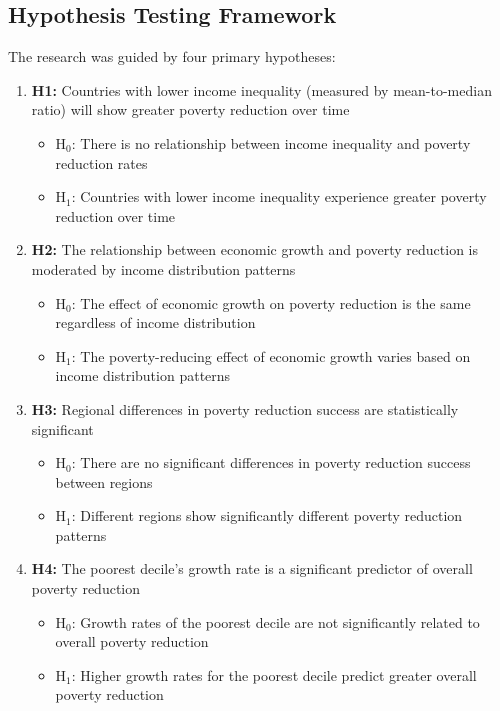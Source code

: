 \documentclass[12pt,a4paper]{article}
\begin{document}
\subsection{Hypothesis Testing Framework}
The research was guided by four primary hypotheses:
\begin{enumerate}
    \item \textbf{H1:} Countries with lower income inequality (measured by mean-to-median ratio) will show greater poverty reduction over time
    \begin{itemize}
        \item H$_0$: There is no relationship between income inequality and poverty reduction rates
        \item H$_1$: Countries with lower income inequality experience greater poverty reduction over time
    \end{itemize}
    \item \textbf{H2:} The relationship between economic growth and poverty reduction is moderated by income distribution patterns
    \begin{itemize}
        \item H$_0$: The effect of economic growth on poverty reduction is the same regardless of income distribution
        \item H$_1$: The poverty-reducing effect of economic growth varies based on income distribution patterns
    \end{itemize}
    \item \textbf{H3:} Regional differences in poverty reduction success are statistically significant
    \begin{itemize}
        \item H$_0$: There are no significant differences in poverty reduction success between regions
        \item H$_1$: Different regions show significantly different poverty reduction patterns
    \end{itemize}
    \item \textbf{H4:} The poorest decile's growth rate is a significant predictor of overall poverty reduction
    \begin{itemize}
        \item H$_0$: Growth rates of the poorest decile are not significantly related to overall poverty reduction
        \item H$_1$: Higher growth rates for the poorest decile predict greater overall poverty reduction
    \end{itemize}
\end{enumerate}
\end{document}

